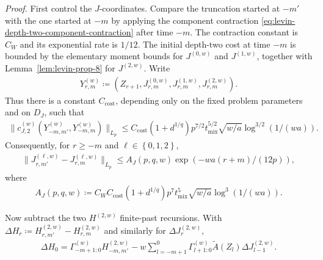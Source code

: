 \textit{Proof.} First control the \(J\)-coordinates. Compare the truncation started at
\(-m'\) with the one started at \(-m\) by applying the component contraction
\eqref{eq:levin-depth-two-component-contraction} after time \(-m\). The contraction
constant is \(C_W\) and its exponential rate is \(1 / 12\). The initial
depth-two cost at time \(-m\) is bounded by the elementary moment bounds for
\(J^{(0,w)}\) and \(J^{(1,w)}\), together with Lemma~\ref{lem:levin-prop-8} for
\(J^{(2,w)}\). Write
\begin{equation}
\begin{aligned}
Y_{r,m}^{(w)} \coloneqq (Z_{r + 1}, J_{r,m}^{(0,w)}, J_{r,m}^{(1,w)}, J_{r,m}^{(2,w)}).
\end{aligned}
\end{equation}
Thus there is a constant \(C_{\text{cost}}\), depending only on the
fixed problem parameters and on \(D_J\), such that
\begin{equation}
\begin{aligned}
\lVert  c_{J,2}^{(w)}(Y_{-m,m'}^{(w)}, Y_{-m,m}^{(w)})  \rVert_{L_p}
  \le C_{\text{cost}} (1 + d^{1 / q}) p^{7 / 2} t_{\text{mix}}^{5 / 2}
     \sqrt{w / a} \log^{3 / 2}(1 / (w a)).
\end{aligned}
\label{eq:finite-past-cost-bound}
\end{equation}
Consequently, for \(r \ge -m\) and \(\ell \in \left\{0,1,2\right\}\),
\begin{equation}
\begin{aligned}
\lVert  J_{r,m'}^{(\ell,w)} - J_{r,m}^{(\ell,w)}  \rVert_{L_p}
  \le A_J(p,q,w) \exp(-w a (r + m) / (12 p)),
\end{aligned}
\label{eq:finite-past-J-cauchy}
\end{equation}
where
\begin{equation}
\begin{aligned}
A_J(p,q,w)
  \coloneqq C_W C_{\text{cost}} (1 + d^{1 / q}) p^7 t_{\text{mix}}^5
     \sqrt{w / a} \log^3(1 / (w a)).
\end{aligned}
\label{eq:finite-past-AJ}
\end{equation}

Now subtract the two \(H^{(2,w)}\) finite-past recursions. With
\(\Delta H_r \coloneqq H_{r,m'}^{(2,w)} - H_{r,m}^{(2,w)}\) and similarly for
\(\Delta J_r^{(2,w)}\),
\begin{equation}
\begin{aligned}
\Delta H_0
  = \Gamma_{-m + 1:0}^{(w)} H_{-m,m'}^{(2,w)}
    - w \sum_{l = -m + 1}^0 \Gamma_{l + 1:0}^{(w)}
        \widetilde{A}(Z_l) \Delta J_{l - 1}^{(2,w)}.
\end{aligned}
\label{eq:finite-past-H2-difference}
\end{equation}

